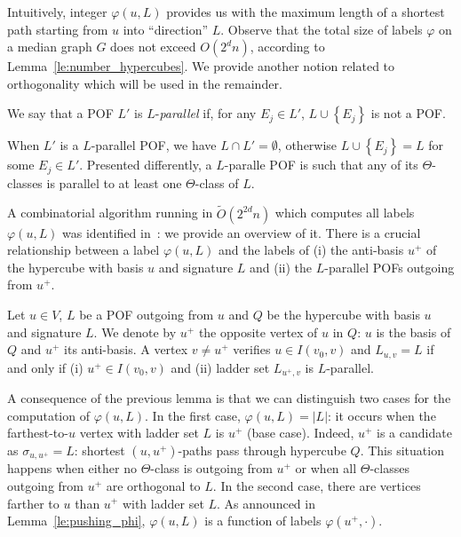 \documentclass[a4paper,UKenglish,numberwithinsect,cleveref, autoref]{lipics-v2021}
\newcommand{\set}[1]{\left\{ #1 \right\}}
\newcommand{\card}[1]{\left| #1 \right|}
\begin{document}
Intuitively, integer $\varphi(u,L)$ provides us with the maximum length of a shortest path starting from $u$ into ``direction'' $L$. Observe that the total size of labels $\varphi$ on a median graph $G$ does not exceed $O(2^dn)$, according to Lemma~\ref{le:number_hypercubes}. We provide another notion related to orthogonality which will be used in the remainder.

\begin{definition}[$L$-parallelism]
We say that a POF $L'$ is $L$-\emph{parallel} if, for any $E_j \in L'$, $L \cup \set{E_j}$ is not a POF.
\label{def:pof_parallel}
\end{definition}

When $L'$ is a $L$-parallel POF, we have $L \cap L' = \emptyset$, otherwise $L \cup \set{E_j} = L$ for some $E_j \in L'$. Presented differently, a $L$-paralle POF is such that any of its $\Theta$-classes is parallel to at least one $\Theta$-class of $L$.

A combinatorial algorithm running in $\tilde{O}(2^{2d}n)$ which computes all labels $\varphi(u,L)$ was identified in~\cite{BeHa21}: we provide an overview of it. There is a crucial relationship between a label $\varphi(u,L)$ and the labels of (i) the anti-basis $u^+$ of the hypercube with basis $u$ and signature $L$ and (ii) the $L$-parallel POFs outgoing from $u^+$.

\begin{lemma}
Let $u \in V$, $L$ be a POF outgoing from $u$ and $Q$ be the hypercube with basis $u$ and signature $L$. We denote by $u^+$ the opposite vertex of $u$ in $Q$: $u$ is the basis of $Q$ and $u^+$ its anti-basis. A vertex $v\neq u^+$ verifies $u \in I(v_0,v)$ and $L_{u,v} = L$ if and only if (i) $u^+ \in I(v_0,v)$ and (ii) ladder set $L_{u^+,v}$ is $L$-parallel.
\label{le:pushing_phi}
\end{lemma}

A consequence of the previous lemma is that we can distinguish two cases for the computation of $\varphi(u,L)$. In the first case, $\varphi(u,L) = \card{L}$: it occurs when the farthest-to-$u$ vertex with ladder set $L$ is $u^+$ (base case). Indeed, $u^+$ is a candidate as $\sigma_{u,u^+} = L$: shortest $(u,u^+)$-paths pass through hypercube $Q$. This situation happens when either no $\Theta$-class is outgoing from $u^+$ or when all $\Theta$-classes outgoing from $u^+$ are orthogonal to $L$. In the second case, there are vertices farther to $u$ than $u^+$ with ladder set $L$. As announced in Lemma~\ref{le:pushing_phi}, $\varphi(u,L)$ is a function of labels $\varphi(u^+,\cdot)$.
\end{document}
